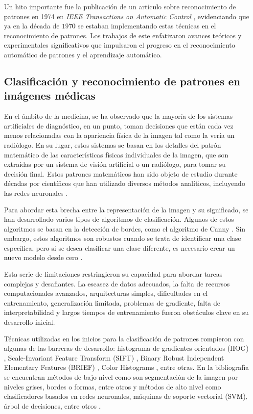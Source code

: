 Un hito importante fue la publicación de un artículo sobre reconocimiento de patrones en 1974 en \textit{IEEE Transactions on Automatic Control} , evidenciando que ya en la década de $1970$ se estaban implementando estas técnicas en el reconocimiento de patrones. Los trabajos de este enfatizaron avances teóricos y experimentales significativos que impulsaron el progreso en el reconocimiento automático de patrones y el aprendizaje automático.

\subsection{Clasificación y reconocimiento de patrones en imágenes médicas}  

En el ámbito de la medicina, se ha observado que la mayoría de los sistemas artificiales de diagnóstico, en un punto, toman decisiones que están cada vez menos relacionadas con la apariencia física de la imagen tal como la vería un radiólogo. En su lugar, estos sistemas se basan en los detalles del patrón matemático de las características físicas individuales de la imagen, que son extraídas por un sistema de visión artificial o un radiólogo, para tomar su decisión final. Estos patrones matemáticos han sido objeto de estudio durante décadas por científicos que han utilizado diversos métodos analíticos, incluyendo las redes neuronales .

Para abordar esta brecha entre la representación de la imagen y su significado, se han desarrollado varios tipos de algoritmos de clasificación. Algunos de estos algoritmos se basan en la detección de bordes, como el algoritmo de Canny . Sin embargo, estos algoritmos son robustos cuando se trata de identificar una clase específica, pero si se desea clasificar una clase diferente, es necesario crear un nuevo modelo desde cero .

Esta serie de limitaciones restringieron su capacidad para abordar tareas complejas y desafiantes. La escasez de datos adecuados, la falta de recursos computacionales avanzados, arquitecturas simples, dificultades en el entrenamiento, generalización limitada, problemas de gradiente, falta de interpretabilidad y largos tiempos de entrenamiento fueron obstáculos clave en su desarrollo inicial.

Técnicas utilizadas en los inicios para la clasificación de patrones rompieron con algunas de las barreras de desarrollo: histograma de gradientes orientados (HOG) , Scale-Invariant Feature Transform (SIFT) , Binary Robust Independent Elementary Features (BRIEF) , Color Histograms , entre otras. En la bibliografía se encuentran métodos de bajo nivel como son segmentación de la imagen por niveles grises, bordes o formas, entre otros y métodos de alto nivel como clasificadores basados en redes neuronales, máquinas de soporte vectorial (SVM), árbol de decisiones, entre otros . 

